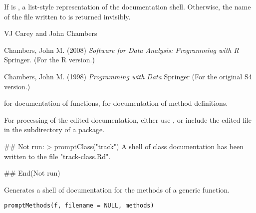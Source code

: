 %
\begin{Value}
If  is , a list-style representation of the
documentation shell.  Otherwise, the name of the file written to is
returned invisibly.
\end{Value}
%
\begin{Author}\relax
VJ Carey  and John Chambers
\end{Author}
%
\begin{References}\relax
Chambers, John M. (2008)
\emph{Software for Data Analysis: Programming with R}
Springer.  (For the R version.)

Chambers, John M. (1998)
\emph{Programming with Data}
Springer (For the original S4 version.) 
\end{References}
%
\begin{SeeAlso}\relax
{} for documentation of functions,
 for documentation of method definitions.

For processing of the edited documentation, either use
,
or include the edited file in the  subdirectory of a
package.
\end{SeeAlso}
%
\begin{Examples}
\begin{ExampleCode}

## Not run: > promptClass("track")
A shell of class documentation has been written to the
file "track-class.Rd".

## End(Not run)
\end{ExampleCode}
\end{Examples}
%
\begin{Description}\relax
Generates a shell of documentation for the methods of a generic
function.
\end{Description}
%
\begin{Usage}
\begin{verbatim}
promptMethods(f, filename = NULL, methods)
\end{verbatim}
\end{Usage}
%
